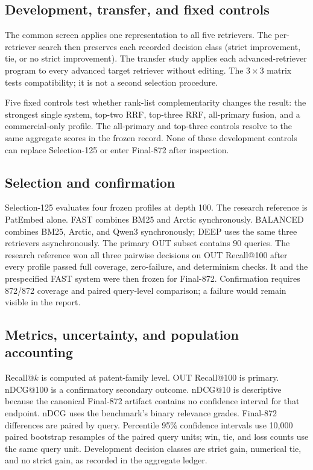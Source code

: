 \documentclass[final,5p,times,twocolumn]{elsarticle}
\begin{document}
\subsection{Development, transfer, and fixed controls}

The common screen applies one representation to all five retrievers. The
per-retriever search then preserves each recorded decision class (strict
improvement, tie, or no strict improvement). The transfer study applies each
advanced-retriever program to every advanced target retriever without editing.
The \(3\times3\) matrix tests compatibility; it is not a second selection
procedure.

Five fixed controls test whether rank-list complementarity changes the result:
the strongest single system, top-two RRF, top-three RRF, all-primary fusion,
and a commercial-only profile. The all-primary and top-three controls resolve
to the same aggregate scores in the frozen record. None of these
development controls can replace Selection-125 or enter Final-872 after
inspection.

\subsection{Selection and confirmation}

Selection-125 evaluates four frozen profiles at depth 100. The research
reference is PatEmbed alone. FAST combines BM25 and Arctic synchronously.
BALANCED combines BM25, Arctic, and Qwen3 synchronously; DEEP uses the same
three retrievers asynchronously. The primary OUT subset contains 90 queries.
The research reference won all three pairwise decisions on OUT Recall@100
after every profile passed full coverage, zero-failure, and determinism checks.
It and the prespecified FAST system were then frozen for Final-872.
Confirmation requires 872/872 coverage and paired query-level comparison; a
failure would remain visible in the report.

\subsection{Metrics, uncertainty, and population accounting}

Recall@\(k\) is computed at patent-family level. OUT Recall@100 is primary.
nDCG@100 is a confirmatory secondary outcome. nDCG@10 is descriptive because
the canonical Final-872 artifact contains no confidence interval for that
endpoint. nDCG uses the benchmark's binary relevance grades. Final-872
differences are paired by query. Percentile 95\% confidence intervals use
10,000 paired bootstrap resamples of the paired query units; win, tie, and
loss counts use the same query unit. Development decision classes are strict
gain, numerical tie, and no strict gain, as recorded in the aggregate ledger.
\end{document}
